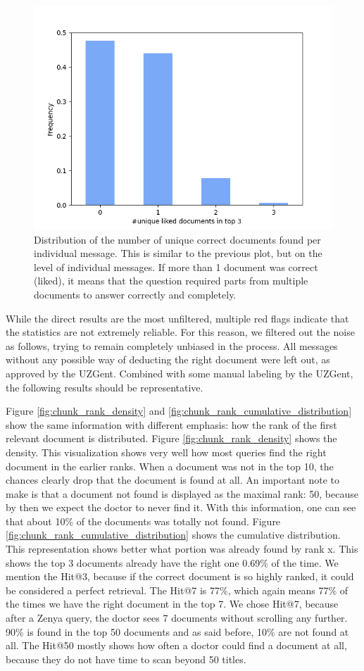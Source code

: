 \begin{figure}[H]
    \centerline{\includegraphics[width=0.7\linewidth]{fig/RAG_nr_top_3.png}}
    \caption{Distribution of the number of unique correct documents found per individual message. This is similar to the previous plot, but on the level of individual messages. If more than 1 document was correct (liked), it means that the question required parts from multiple documents to answer correctly and completely.}
    \label{fig:liked_docs}
\end{figure}

While the direct results are the most unfiltered, multiple red flags indicate that the statistics are not extremely reliable. For this reason, we filtered out the noise as follows, trying to remain completely unbiased in the process. All messages without any possible way of deducting the right document were left out, as approved by the UZGent. Combined with some manual labeling by the UZGent, the following results should be representative.

Figure \ref{fig:chunk_rank_density} and \ref{fig:chunk_rank_cumulative_distribution} show the same information with different emphasis: how the rank of the first relevant document is distributed. Figure \ref{fig:chunk_rank_density} shows the density. This visualization shows very well how most queries find the right document in the earlier ranks. When a document was not in the top 10, the chances clearly drop that the document is found at all. An important note to make is that a document not found is displayed as the maximal rank: 50, because by then we expect the doctor to never find it. With this information, one can see that about 10\% of the documents was totally not found. Figure \ref{fig:chunk_rank_cumulative_distribution} shows the cumulative distribution. This representation shows better what portion was already found by rank x. This shows the top 3 documents already have the right one 0.69\% of the time. We mention the Hit@3, because if the correct document is so highly ranked, it could be considered a perfect retrieval. The Hit@7 is 77\%, which again means 77\% of the times we have the right document in the top 7. We chose Hit@7, because after a Zenya query, the doctor sees 7 documents without scrolling any further. 90\% is found in the top 50 documents and as said before, 10\% are not found at all. The Hit@50 mostly shows how often a doctor could find a document at all, because they do not have time to scan beyond 50 titles.

